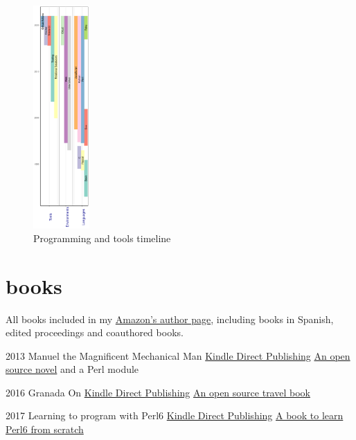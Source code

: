 \documentclass[]{friggeri-jj-cv}
\begin{document}
  \begin{figure}
    \centering
    \includegraphics[width=0.19\textwidth]{img/timeline.png}
    \caption{Programming and tools timeline}
  \end{figure}

\section{books}

All books included in my
\href{https://amazon.com/author/jjmerelo}{Amazon's author page},
including books in Spanish, edited proceedings and coauthored books.

\begin{entrylist}
  \entry
    {2013}
    {Manuel the Magnificent Mechanical Man}
    {\href{http://www.amazon.com/dp/B00ED084BK/}{Kindle Direct Publishing}}
    {\href{http://jj.github.io/hoborg}{An open source novel} and a
      Perl module}
  \end{entrylist}

  \begin{entrylist}
  \entry
    {2016}
    {Granada On}
    {\href{https://www.amazon.com/Granada-Beaten-Track-explorations-Andalusia/dp/1523257083}{Kindle Direct Publishing}}
    {\href{http://github.com/JJ/granada-off}{An open source travel book}}
  \end{entrylist}

  \begin{entrylist}
  \entry
    {2017}
    {Learning to program with Perl6}
    {\href{https://www.amazon.com/Learning-program-Perl-Getting-programming/dp/1521795789/ref=sr_1_1?ie=UTF8&qid=1518685809&sr=8-1}{Kindle Direct Publishing}}
    {\href{http://github.com/JJ/perl6em}{A book to learn Perl6 from scratch}}
  \end{entrylist}
\end{document}
